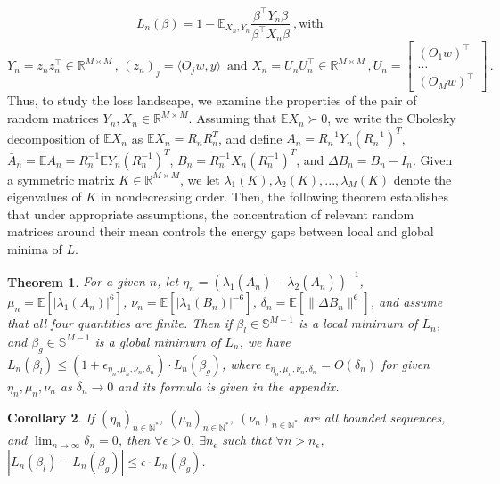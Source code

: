 \documentclass{article} \usepackage{iclr2019_conference,times}
\newcommand{\R}{\mathbb{R}}
\newtheorem{theorem}{Theorem}[section]
\newtheorem{corollary}[theorem]{Corollary}
\newcommand{\expe}{\mathbb{E}}
\begin{document}
\begin{equation}
\label{loss}
    L_n(\beta) =1-\mathbb{E}_{X_n,Y_n} \frac{\beta^\top Y_n \beta}{ \beta^\top X_n \beta}~,\text{with }
\end{equation}
$$Y_n = z_n z_n^\top \in \R^{M \times M}\,,\,(z_n)_j = \langle O_j w, y \rangle\,\text{ and } X_n = U_n U_n^\top\in \R^{M \times M} \,,U_n = \begin{bmatrix}
(O_1 w)^\top \\
\dots \\
(O_M w)^\top 
\end{bmatrix}\,.
$$
Thus, to study the loss landscape, we examine the properties of the pair of random matrices $Y_n, X_n \in \R^{M \times M}$. Assuming that $\expe X_n \succ 0$, we write the Cholesky decomposition of $\expe X_n$ as $\expe X_n = R_n R_n^T$, and define $A_n = R_n^{-1} Y_n (R_n^{-1})^T$, $\bar{A}_n = \expe A_n = R_n^{-1} \expe Y_n (R_n^{-1})^T$, $B_n = R_n^{-1} X_n (R_n^{-1})^T$, and $\Delta B_n = B_n - I_n$. Given a symmetric matrix $K \in \mathbb{R}^{M \times M}$, we let $\lambda_1(K), \lambda_2(K), ..., \lambda_M(K)$ denote the eigenvalues of $K$ in nondecreasing order. Then, the following theorem establishes that under appropriate assumptions, the concentration of relevant random matrices around their mean controls the energy gaps between local and global minima of $L$.

\begin{theorem} 
\label{main_theorem}
For a given $n$, let $\eta_n = (\lambda_1(\bar{A}_n) - \lambda_2(\bar{A}_n))^{-1}$, $\mu_n = \expe [|\lambda_1(A_n)|^6]$, $\nu_n = \expe [|\lambda_1(B_n)|^{-6}]$, $ \delta_n = \expe [\|  \Delta B_n \|^6]$, and assume that all four quantities are finite.
Then if $\beta_l \in \mathbb{S}^{M-1}$ is a local minimum of $L_n$, and $\beta_g \in \mathbb{S}^{M-1}$ is a global minimum of $L_n$, we have $L_n(\beta_l) \leq (1+\epsilon_{\eta_n, \mu_n, \nu_n, \delta_n}) \cdot L_n(\beta_g)$, where $\epsilon_{\eta_n, \mu_n, \nu_n, \delta_n} = O (\delta_n)$ for given $\eta_n, \mu_n, \nu_n$ as $\delta_n \to 0$ and its formula is given in the appendix.

\end{theorem}

\begin{corollary}
\label{asymptotic}
If $(\eta_n)_{n \in \mathbb{N}^*}$, $(\mu_n)_{n \in \mathbb{N}^*}$, $(\nu_n)_{n \in \mathbb{N}^*}$ are all bounded sequences, and $\lim_{n \to \infty} \delta_n = 0$, then $\forall \epsilon > 0$, $\exists n_\epsilon$ such that $\forall n > n_\epsilon$, $|L_n(\beta_l) - L_n(\beta_g)| \leq \epsilon \cdot L_n(\beta_g)$.
\end{corollary}
\end{document}
